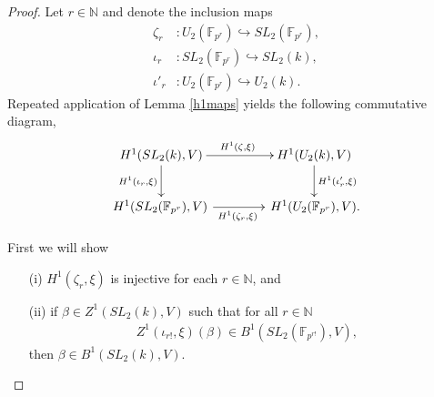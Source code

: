 \begin{proof}
	Let $r \in \mathbb{N}$ and denote the inclusion maps
\begin{align*}
	\zeta_r&:U_2(\mathbb{F}_{p^r}) \hookrightarrow SL_2(\mathbb{F}_{p^r}), \\
	\iota_r&:SL_2(\mathbb{F}_{p^r}) \hookrightarrow SL_2(k), \\
	\iota'_r&:U_2(\mathbb{F}_{p^r}) \hookrightarrow U_2(k).
\end{align*}
Repeated application of Lemma \ref{h1maps} yields the following commutative diagram,
\begin{align*}
	\xymatrix@C=40pt{
		H^1(SL_2(k), V) \ar[r]^{H^1(\zeta, \xi)} \ar[d]_{H^1(\iota_r, \xi)} & H^1(U_2(k), V) \ar[d]^{H^1(\iota'_r, \xi)} \\
		H^1(SL_2(\mathbb{F}_{p^r}), V)\, \ar[r]_{H^1(\zeta_r, \xi)} &\, H^1(U_2(\mathbb{F}_{p^r}), V).
	}
\end{align*}

First we will show
\begin{itemize}
\item [(i)] $H^1(\zeta_r, \xi)$ is injective for each $r \in \mathbb{N}$, and
\item [(ii)] if $\beta \in Z^1(SL_2(k), V)$ such that for all $r \in \mathbb{N}$
\begin{align*} Z^1(\iota_{r!}, \xi)(\beta) \in B^1(SL_2(\mathbb{F}_{p^{r!}}), V),
\end{align*}
then $\beta \in B^1(SL_2(k), V)$.
\end{itemize}


\end{proof}
